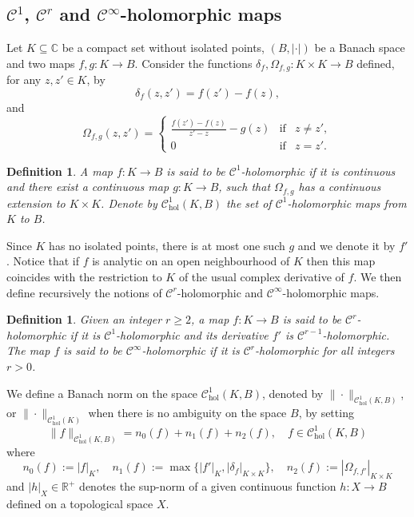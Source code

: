 \documentclass[10pt]{article}
\newtheorem{definition}[theorem]{Definition}
\newcommand{\R}{\mathbb{R}}
\newcommand{\CC}{\mathbb{C}}
\begin{document}
\subsection{$\mathscr{C}^1$, $\mathscr{C}^r$ and $\mathscr{C}^\infty$-holomorphic maps}
\label{sc:holomorphic}

Let $K\subseteq \CC$ be a compact set without isolated points, $(B, |\cdot|)$ be a Banach space and two maps $f,g:K\to B$. Consider the functions $\delta_f, \Omega_{f,g}: K \times K \to B$ defined, for any $z,z'\in K$, by
$$\delta_f(z,z') = f(z')-f(z),$$
and %
$$\Omega_{f,g}(z,z') = \left\{ \begin{array}{ccl} \frac{f(z')-f(z)}{z'-z}-g(z) & \text{if} & z \neq z', \\ 0 & \text{if} & z = z' . \end{array}\right.$$

\begin{definition}
A map $f:K\to B$ is said to be \emph{$\mathscr C^1$-holomorphic} if it is continuous and there exist a continuous map $g:K\to B$, such that $\Omega_{f,g}$ has a continuous extension to $K\times K$. Denote by $\mathscr C^1_{\text{hol}}(K,B)$ the set of $\mathscr C^1$-holomorphic maps from $K$ to $B$.
\end{definition}

Since $K$ has no isolated points, there is at most one such $g$ and we denote it by $f'$. Notice that if $f$ is analytic on an open neighbourhood of $K$ then this map coincides with the restriction to $K$ of the usual complex derivative of $f$. We then define recursively the notions of $\mathscr C^r$-holomorphic and $\mathscr C^\infty$-holomorphic maps.

\begin{definition}
Given an integer $r\geq 2$, a map $f:K\to B$ is said to be \emph{$\mathscr C^r$-holomorphic} if it is $\mathscr C^1$-holomorphic and its derivative $f'$ is $\mathscr C^{r-1}$-holomorphic. The map $f$ is said to be $\mathscr C^\infty$-holomorphic if it is $\mathscr C^r$-holomorphic for all integers $r>0$.
\end{definition}

We define a Banach norm on the space $\mathscr C^1_{\text{hol}}(K,B)$, denoted by $\|\cdot\|_{\mathscr C^1_{\text{hol}}(K,B)}$, or $\|\cdot\|_{\mathscr C^1_{\text{hol}}(K)}$ when there is no ambiguity on the space $B$, by setting
\[
\|f\|_{\mathscr C^1_{\text{hol}}(K,B)} = n_0(f)+n_1(f)+n_2(f),
\quad f\in \mathscr C^1_{\text{hol}}(K,B)\]
where
\[n_0(f) := |f|_K, \quad n_1(f) := \max\{ |f'|_K, |\delta_f|_{K \times K}\}, \quad n_2(f) := |\Omega_{f,f'}|_{K\times K}\]
and $|h|_X\in\R^+$ denotes the sup-norm of a given continuous function $h:X\to B$ defined on a topological space $X$.
\end{document}
